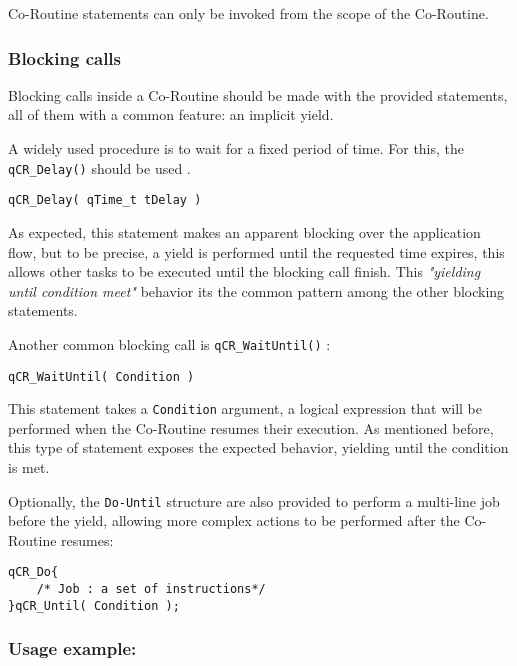 \begin{tcolorbox}
\HandRight Co-Routine statements can only be invoked from the scope of the Co-Routine.
\end{tcolorbox}


\subsubsection{Blocking calls}
Blocking calls inside a Co-Routine should be made with the provided statements, all of them with a common feature: an implicit yield.

A widely used procedure is to wait for a fixed period of time. For this, the \lstinline{qCR_Delay()} should be used . 
\medskip


\begin{lstlisting}[style=CStyle]
qCR_Delay( qTime_t tDelay ) 
\end{lstlisting}

As expected, this statement makes an apparent blocking over the application flow, but to be precise, a yield is performed until the requested time expires, this allows other tasks to be executed until the blocking call finish. This \textit{"yielding until condition meet"} behavior its the common pattern among the other blocking statements.
\medskip

Another common blocking call is \lstinline{qCR_WaitUntil()} :

\begin{lstlisting}[style=CStyle]
qCR_WaitUntil( Condition ) 
\end{lstlisting}

This statement takes a \lstinline{Condition} argument, a logical expression that will be performed when the Co-Routine resumes their execution. As mentioned before, this type of statement exposes the expected behavior, yielding until the condition is met.
\medskip


Optionally, the \lstinline{Do-Until}   structure are also provided to perform a multi-line job before the yield, allowing more complex actions to be performed after the Co-Routine  resumes: 
\medskip

\begin{lstlisting}[style=CStyle]
qCR_Do{
    /* Job : a set of instructions*/
}qCR_Until( Condition );
\end{lstlisting}

\subsubsection*{Usage example:}


